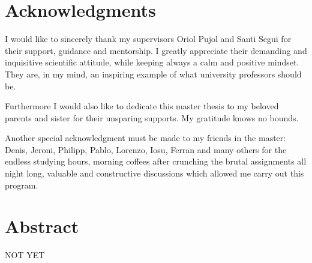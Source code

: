 \documentclass[11pt, oneside]{book}
\begin{document}
%
%
%
\setcounter{page}{3}

\thispagestyle{empty}

\thispagestyle{empty}
\chapter*{Acknowledgments}
\thispagestyle{empty}
I would like to sincerely thank my supervisors Oriol Pujol and Santi Segui for their support, guidance and mentorship. I greatly appreciate their demanding and inquisitive scientific attitude, while keeping always a calm and positive mindset. They are, in my mind, an inspiring example of what university professors should be.

Furthermore I would also like to dedicate this master thesis to my beloved parents and sister for their unsparing supports. My gratitude knows no bounds.

 Another special acknowledgment must be made to my friends in the master: Denis, Jeroni, Philipp, Pablo, Lorenzo, Iosu, Ferran and many others for the endless studying hours, morning coffees after crunching the brutal assignments all night long, valuable and constructive discussions which allowed me carry out this program. 
 



\setcounter{page}{0}
\clearpage

\newpage
{} %
\chapter*{Abstract}
\thispagestyle{empty}
NOT YET

\tableofcontents

\listoffigures
\end{document}
